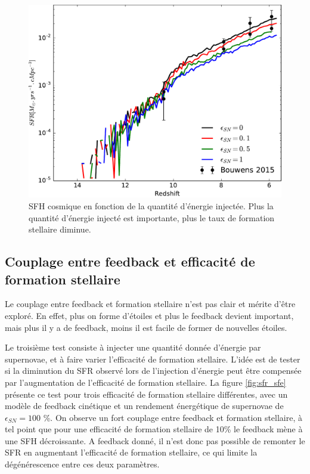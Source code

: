 \begin{figure}
        \includegraphics[width=.95\textwidth]{img/03/sedov/sneff_SFR.pdf} 
        \caption[SFH cosmique en fonction de la quantité d'énergie injectée]{SFH cosmique en fonction de la quantité d'énergie injectée. 
        Plus la quantité d'énergie injecté est importante, plus le taux de formation stellaire diminue.
        }
 		\label{fig:sfr_egy}
\end{figure}

\subsection{Couplage entre feedback et efficacité de formation stellaire}

Le couplage entre feedback et formation stellaire n'est pas clair et mérite d'être exploré.
En effet, plus on forme d'étoiles et plus le feedback devient important, mais plus il y a de feedback, moins il est facile de former de nouvelles étoiles.

Le troisième test consiste à injecter une quantité donnée d'énergie par supernovae, et à faire varier l'efficacité de formation stellaire.
L'idée est de tester si la diminution du SFR observé lors de l'injection d'énergie peut être compensée par l'augmentation de l'efficacité de formation stellaire.
La figure \ref{fig:sfr_sfe} présente ce test pour trois efficacité de formation stellaire différentes, avec un modèle de feedback cinétique et un rendement énergétique de supernovae de $\epsilon_{SN}=100$ \%.
On observe un fort couplage entre feedback et formation stellaire, à tel point que pour une efficacité de formation stellaire de 10\% le feedback mène à une \ac{SFH} décroissante.
A feedback donné, il n'est donc pas possible de remonter le \ac{SFR} en augmentant l'efficacité de formation stellaire, ce qui limite la dégénérescence entre ces deux paramètres.


